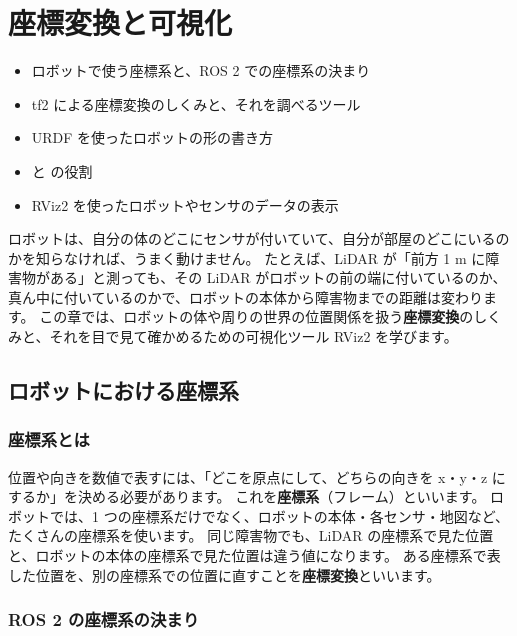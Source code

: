 \chapter{座標変換と可視化}
\label{chap:tf_viz}

\begin{goalbox}
  \begin{itemize}
    \item ロボットで使う座標系と、ROS 2 での座標系の決まり
    \item tf2 による座標変換のしくみと、それを調べるツール
    \item URDF を使ったロボットの形の書き方
    \item {} と  の役割
    \item RViz2 を使ったロボットやセンサのデータの表示
  \end{itemize}
\end{goalbox}

ロボットは、自分の体のどこにセンサが付いていて、自分が部屋のどこにいるのかを知らなければ、うまく動けません。
たとえば、LiDAR が「前方 1 m に障害物がある」と測っても、その LiDAR がロボットの前の端に付いているのか、真ん中に付いているのかで、ロボットの本体から障害物までの距離は変わります。
この章では、ロボットの体や周りの世界の位置関係を扱う\textbf{座標変換}のしくみと、それを目で見て確かめるための可視化ツール RViz2 を学びます。

\section{ロボットにおける座標系}
\label{sec:tf-viz-frames}

\subsection{座標系とは}

位置や向きを数値で表すには、「どこを原点にして、どちらの向きを x・y・z にするか」を決める必要があります。
これを\textbf{座標系}（フレーム）といいます。
ロボットでは、1 つの座標系だけでなく、ロボットの本体・各センサ・地図など、たくさんの座標系を使います。
同じ障害物でも、LiDAR の座標系で見た位置と、ロボットの本体の座標系で見た位置は違う値になります。
ある座標系で表した位置を、別の座標系での位置に直すことを\textbf{座標変換}といいます。

\subsection{ROS 2 の座標系の決まり}

